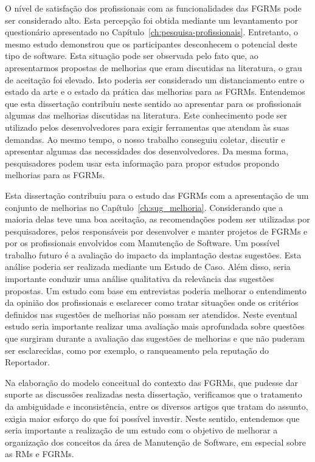 O nível de satisfação dos profissionais com as funcionalidades das FGRMs pode
ser considerado alto. Esta percepção foi obtida mediante um levantamento por
questionário apresentado no Capítulo~\ref{ch:pesquisa-profissionais}.
Entretanto, o mesmo estudo demonstrou que os participantes desconhecem o
potencial deste tipo de software. Esta situação pode ser observada pelo fato
que, ao apresentarmos propostas de melhorias que eram discutidas na literatura,
o grau de aceitação foi elevado. Isto poderia ser considerado um distanciamento
entre o estado da arte e o estado da prática das melhorias para as FGRMs.
Entendemos que esta dissertação contribuiu neste sentido ao apresentar para os
profissionais algumas das melhorias discutidas na literatura. Este conhecimento
pode ser utilizado pelos desenvolvedores para exigir ferramentas que atendam às
suas demandas. Ao mesmo tempo, o nosso trabalho conseguiu coletar, discutir e
apresentar algumas das necessidades dos desenvolvedores. Da mesma forma,
pesquisadores podem usar esta informação para propor estudos propondo melhorias
para as FGRMs.

Esta dissertação contribuiu para o estudo das FGRMs com a apresentação de um
conjunto de melhorias no Capítulo~\ref{ch:sug_melhoria}. Considerando que a
maioria delas teve uma boa aceitação, as recomendações podem ser utilizadas por
pesquisadores, pelos responsáveis por desenvolver e manter projetos de FGRMs e
por os profissionais envolvidos com Manutenção de Software. Um possível
trabalho futuro é a avaliação do impacto da implantação destas sugestões. Esta
análise poderia ser realizada mediante um Estudo de Caso. Além disso, seria
importante conduzir uma análise qualitativa da relevância das sugestões
propostas. Um estudo com base em entrevistas poderia melhorar o entendimento da
opinião dos profissionais e esclarecer como tratar situações onde os critérios
definidos nas sugestões de melhorias não possam ser atendidos. Neste eventual
estudo seria importante realizar uma avaliação mais aprofundada sobre questões
que surgiram durante a avaliação das sugestões de melhorias e que não puderam
ser esclarecidas, como por exemplo, o ranqueamento pela reputação do
Reportador.

Na elaboração do modelo conceitual do contexto das FGRMs, que pudesse dar
suporte as discussões realizadas nesta dissertação, verificamos que o
tratamento da ambiguidade e inconsistência, entre os diversos artigos que
tratam do assunto, exigia maior esforço do que foi possível investir. Neste
sentido, entendemos que seria importante a realização de um estudo com o
objetivo de melhorar a organização dos conceitos da área de Manutenção de
Software, em especial sobre as RMs e FGRMs.

